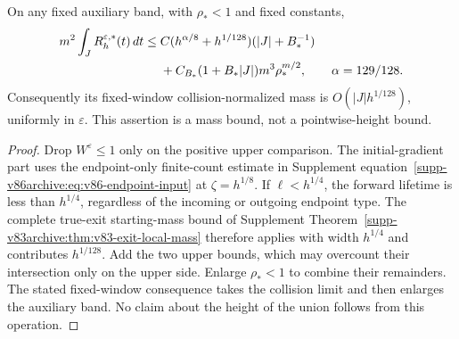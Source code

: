 \begin{proposition}
\label{prop:v88-exceptional-mass}
On any fixed auxiliary band, with $\rho_*<1$ and fixed constants,
\begin{align}
 m^2\int_JR_h^{\varepsilon,*}(t)\,dt
 \le{}&C(h^{\alpha/8}+h^{1/128})(|J|+B_*^{-1})\notag\\
 &+C_{B_*}(1+B_*|J|)m^3\rho_*^{m/2},\qquad \alpha=129/128.
                                       \label{eq:v88-exceptional-mass}
\end{align}
Consequently its fixed-window collision-normalized mass is
$O(|J|h^{1/128})$, uniformly in $\varepsilon$. This assertion is a
mass bound, not a pointwise-height bound.
\end{proposition}
\begin{proof}
Drop $W^\varepsilon\le1$ only on the positive upper comparison.
The initial-gradient part uses the endpoint-only finite-count estimate
in Supplement equation~\eqref{supp-v86archive:eq:v86-endpoint-input}
at $\zeta=h^{1/8}$. If $\ell<h^{1/4}$, the forward lifetime is
less than $h^{1/4}$, regardless of the incoming or outgoing endpoint
type. The complete true-exit starting-mass bound of Supplement
Theorem~\ref{supp-v83archive:thm:v83-exit-local-mass} therefore applies
with width $h^{1/4}$ and contributes $h^{1/128}$. Add the two upper
bounds, which may overcount their intersection only on the upper
side. Enlarge $\rho_*<1$ to combine their remainders. The stated
fixed-window consequence takes the collision limit and then enlarges
the auxiliary band. No claim about the height of the union follows
from this operation.
\end{proof}

